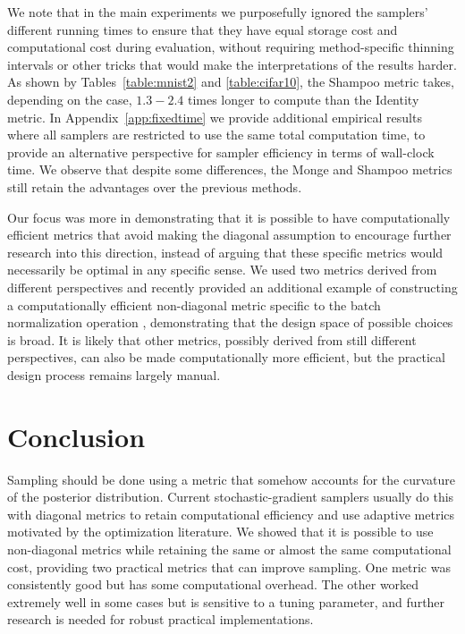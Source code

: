 \documentclass[10pt]{article} %
\theoremstyle{plain}
\theoremstyle{definition}
\theoremstyle{remark}
\begin{document}
We note that in the main experiments we purposefully ignored the samplers' different running times to ensure that they have equal storage cost and computational cost during evaluation, without requiring method-specific thinning intervals or other tricks that would make the interpretations of the results harder. As shown by Tables~\ref{table:mnist2} and \ref{table:cifar10}, the Shampoo metric takes, depending on the case, $1.3-2.4$ times longer to compute than the Identity metric. In Appendix~\ref{app:fixedtime} we provide additional empirical results where all samplers are restricted to use the same total computation time, to provide an alternative perspective for sampler efficiency in terms of wall-clock time. We observe that despite some differences, the Monge and Shampoo metrics still retain the advantages over the previous methods.

Our focus was more in demonstrating that it is possible to have computationally efficient metrics that avoid making the diagonal assumption to encourage further research into this direction, instead of arguing that these specific metrics would necessarily be optimal in any specific sense. We used two metrics derived from different perspectives and \citet{Lange2023} recently provided an additional example of constructing a computationally efficient non-diagonal metric specific to the batch normalization operation \citep{Ioffe2015}, demonstrating that the design space of possible choices is broad.
It is likely that other metrics, possibly derived from still different perspectives, can also be made computationally more efficient, but the practical design process remains largely manual.

\section{Conclusion}

Sampling should be done using a metric that somehow accounts for the curvature of the posterior distribution. Current stochastic-gradient samplers usually do this with diagonal metrics to retain computational efficiency and use adaptive metrics motivated by the optimization literature. We showed that it is possible to use non-diagonal metrics while retaining the same or almost the same computational cost, providing two practical metrics that can improve sampling. One metric was consistently good but has some computational overhead. The other worked extremely well in some cases but is sensitive to a tuning parameter, and further research is needed for robust practical implementations.
\end{document}
